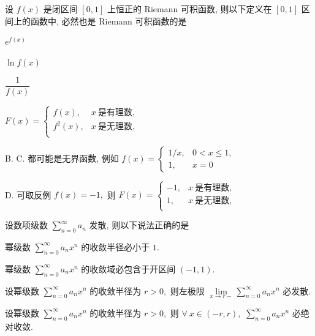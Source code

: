 \begin{question}
  设 $f(x)$ 是闭区间 $[0, 1]$ 上恒正的 Riemann 可积函数, 则以下定义在 $[0, 1]$ 区间上的函数中, 必然也是 Riemann 可积函数的是 \paren[A]

  \begin{choices}
    \item $e^{f(x)}$
    \item $\ln{f(x)}$
    \item $\dfrac{1}{f(x)}$
    \item $F(x) = \begin{cases}
        f(x), & x ~ \text{是有理数}, \\
        f^2(x), & x ~ \text{是无理数}, \\
    \end{cases}$
  \end{choices}
\end{question}

\begin{solution}
  B. C. 都可能是无界函数, 例如 $f(x) = \begin{cases}
    1 / x, & 0 < x \leqslant 1, \\
    1, & x = 0
  \end{cases}$

  D. 可取反例 $f(x) = -1,$ 则 $F(x) = \begin{cases}
    -1, & x ~ \text{是有理数}, \\
    1, & x ~ \text{是无理数}, \\
  \end{cases}$
\end{solution}

\begin{question}
  设数项级数 $\sum\limits_{n=0}^\infty a_n$ 发散, 则以下说法正确的是 \paren[D]

  \begin{choices}
    \item 幂级数 $\sum\limits_{n=0}^\infty a_n x^n$ 的收敛半径必小于 $1.$
    \item 幂级数 $\sum\limits_{n=0}^\infty a_n x^n$ 的收敛域必包含于开区间 $(-1, 1).$
    \item 设幂级数 $\sum\limits_{n=0}^\infty a_n x^n$ 的收敛半径为 $r > 0,$ 则左极限 $\lim\limits_{x \to r-} \sum\limits_{n=0}^\infty a_n x^n$ 必发散.
    \item 设幂级数 $\sum\limits_{n=0}^\infty a_n x^n$ 的收敛半径为 $r > 0,$ 则 $\forall ~ x \in (-r, r),$ $\sum\limits_{n=0}^\infty a_n x^n$ 必绝对收敛.
  \end{choices}
\end{question}

